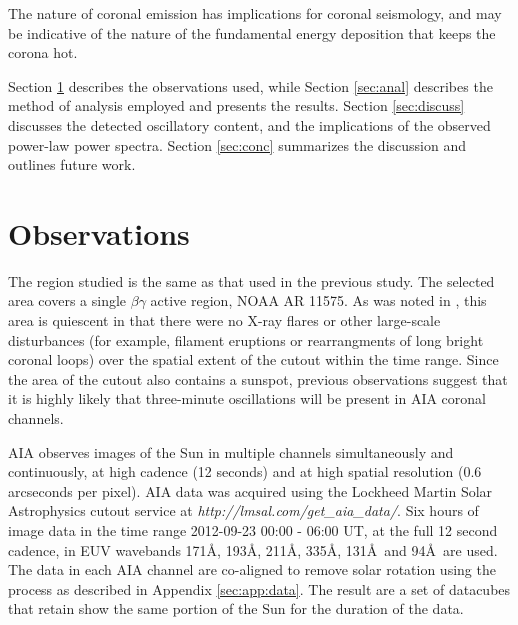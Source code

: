\documentclass[onecolumn]{emulateapj}
\newcommand{\BF}{ }
\begin{document}
 The nature
of coronal emission has implications for coronal seismology, and may
be indicative of the nature of the fundamental energy deposition that
keeps the corona hot.  

Section \ref{sec:obs} describes the
observations used, while Section \ref{sec:anal} describes the method
of analysis employed and presents the results.  Section
\ref{sec:discuss} discusses the detected oscillatory content, and the
implications of the observed power-law power spectra.  Section
\ref{sec:conc} summarizes the discussion and outlines future work.


\section{Observations}\label{sec:obs}
The region studied is the same as that used in the previous
\cite{ireland2015} study.  The selected area covers a single
$\beta\gamma$ active region, NOAA AR 11575.  As was noted in
\cite{ireland2015} , this area is quiescent in that there were no
X-ray flares or other large-scale disturbances (for example, filament
eruptions or rearrangments of long bright coronal loops) over the
spatial extent of the cutout within the time range.  Since the area of
the cutout also contains a sunspot, previous observations
\citep{2002A&A...387L..13D} suggest that it is highly likely that
three-minute oscillations will be present in AIA coronal channels.

{\BF AIA} observes images of the Sun in multiple channels
simultaneously and continuously, at high cadence (12 seconds) and at
high spatial resolution (0.6 arcseconds per pixel).  {\BF AIA} data
was acquired using the Lockheed Martin Solar Astrophysics cutout
service at {\it http://lmsal.com/get\_aia\_data/}.  Six hours of image
data in the time range 2012-09-23 00:00 - 06:00 UT, at the full 12
second cadence, in EUV wavebands 171\AA, 193\AA, 211\AA, 335\AA,
131\AA\ and 94\AA\ are used.  The data in each AIA channel are
co-aligned to remove solar rotation using the process as described in
Appendix \ref{sec:app:data}.  The result are a set of datacubes that
retain show the same portion of the Sun for the duration of the data. 
\end{document}
